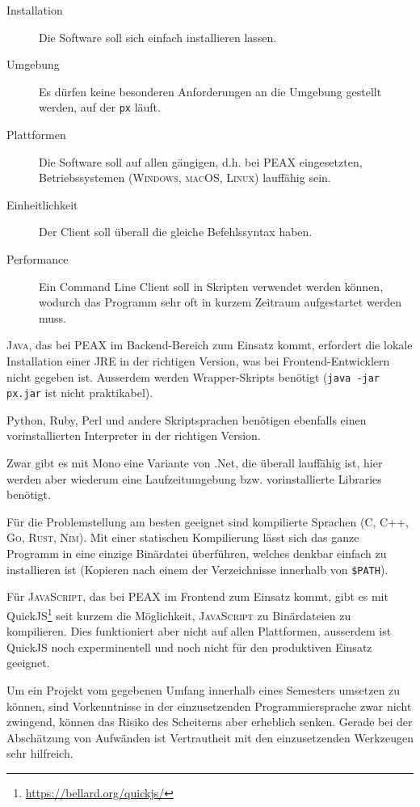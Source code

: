 \begin{description}
    \item[Installation] Die Software soll sich einfach installieren lassen.
    \item[Umgebung] Es dürfen keine besonderen Anforderungen an die Umgebung gestellt werden, auf der \texttt{px} läuft.
    \item[Plattformen] Die Software soll auf allen gängigen, d.h. bei PEAX eingesetzten, Betriebssystemen (\textsc{Windows}, \textsc{macOS}, \textsc{Linux}) lauffähig sein.
    \item[Einheitlichkeit] Der Client soll überall die gleiche Befehlssyntax haben.
    \item[Performance] Ein Command Line Client soll in Skripten verwendet werden können, wodurch das Programm sehr oft in kurzem Zeitraum aufgestartet werden muss.
\end{description}

\textsc{Java}, das bei PEAX im Backend-Bereich zum Einsatz kommt, erfordert die lokale Installation einer JRE in der richtigen Version, was bei Frontend-Entwicklern nicht gegeben ist. Ausserdem werden Wrapper-Skripts benötigt (\texttt{java -jar px.jar} ist nicht praktikabel).

Python, Ruby, Perl und andere Skriptsprachen benötigen ebenfalls einen vorinstallierten Interpreter in der richtigen Version.

Zwar gibt es mit Mono eine Variante von .Net, die überall lauffähig ist, hier werden aber wiederum eine Laufzeitumgebung bzw. vorinstallierte Libraries benötigt.

Für die Problemstellung am besten geeignet sind kompilierte Sprachen (C, C++, \textsc{Go}, \textsc{Rust}, \textsc{Nim}). Mit einer statischen Kompilierung lässt sich das ganze Programm in eine einzige Binärdatei überführen, welches denkbar einfach zu installieren ist (Kopieren nach einem der Verzeichnisse innerhalb von \texttt{\$PATH}).

Für \textsc{JavaScript}, das bei PEAX im Frontend zum Einsatz kommt, gibt es mit QuickJS\footnote{\url{https://bellard.org/quickjs/}} seit kurzem die Möglichkeit, \textsc{JavaScript} zu Binärdateien zu kompilieren. Dies funktioniert aber nicht auf allen Plattformen, ausserdem ist QuickJS noch experminentell und noch nicht für den produktiven Einsatz geeignet.

Um ein Projekt vom gegebenen Umfang innerhalb eines Semesters umsetzen zu können, sind Vorkenntnisse in der einzusetzenden Programmiersprache zwar nicht zwingend, können das Risiko des Scheiterns aber erheblich senken. Gerade bei der Abschätzung von Aufwänden ist Vertrautheit mit den einzusetzenden Werkzeugen sehr hilfreich.

